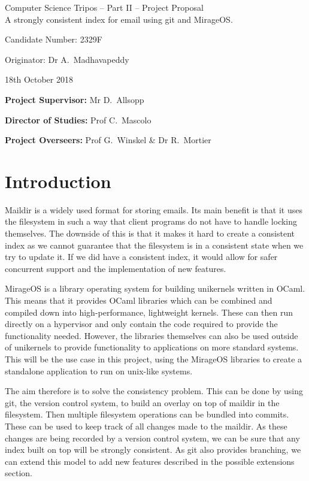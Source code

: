 \documentclass[12pt,a4paper,twoside]{article}
\begin{document}
\begin{center}
    \Large
    Computer Science Tripos -- Part II -- Project Proposal\\[4mm]
    \LARGE
    A strongly consistent index for email using git and MirageOS.

    \large
    Candidate Number: 2329F

    Originator: Dr A.~Madhavapeddy

    18th October 2018
\end{center}

\vspace{5mm}

\textbf{Project Supervisor:} Mr D.~Allsopp

\textbf{Director of Studies:} Prof C.~Mascolo

\textbf{Project Overseers:} Prof G.~Winskel \& Dr R.~Mortier


\section*{Introduction}

Maildir is a widely used format for storing emails. Its main benefit is that it uses the filesystem in such a way that client programs do not have to handle locking themselves. The downside of this is that it makes it hard to create a consistent index as we cannot guarantee that the filesystem is in a consistent state when we try to update it. If we did have a consistent index, it would allow for safer concurrent support and the implementation of new features.

MirageOS is a library operating system for building unikernels written in OCaml. This means that it provides OCaml libraries which can be combined and compiled down into high-performance, lightweight kernels. These can then run directly on a hypervisor and only contain the code required to provide the functionality needed. However, the libraries themselves can also be used outside of unikernels to provide functionality to applications on more standard systems. This will be the use case in this project, using the MirageOS libraries to create a standalone application to run on unix-like systems.

The aim therefore is to solve the consistency problem. This can be done by using git, the version control system, to build an overlay on top of maildir in the filesystem. Then multiple filesystem operations can be bundled into commits. These can be used to keep track of all changes made to the maildir. As these changes are being recorded by a version control system, we can be sure that any index built on top will be strongly consistent. As git also provides branching, we can extend this model to add new features described in the possible extensions section.
\end{document}
